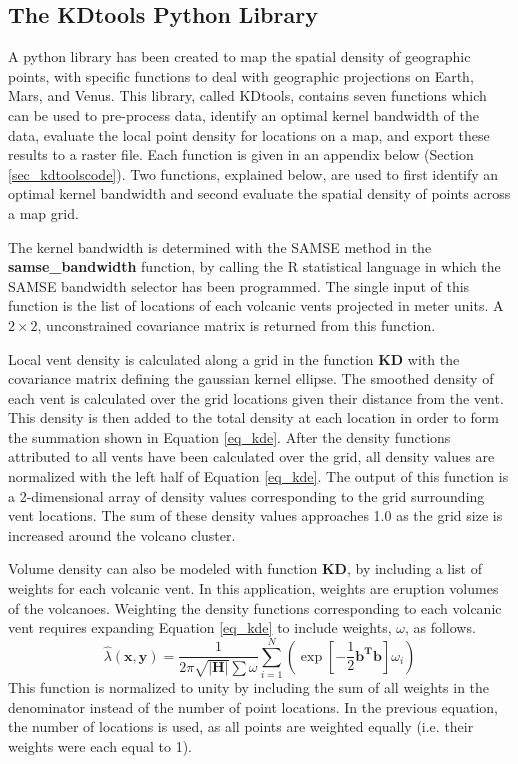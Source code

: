 \documentclass[12pt,letter]{article}
\begin{document}
\subsection{The KDtools Python Library}

A python library has been created to map the spatial density of geographic points, with specific functions to deal with geographic projections on Earth, Mars, and Venus. This library, called KDtools, contains seven functions which can be used to pre-process data, identify an optimal kernel bandwidth of the data, evaluate the local point density for locations on a map, and export these results to a raster file. Each function is given in an appendix below (Section \ref{sec_kdtoolscode}). Two functions, explained below, are used to first identify an optimal kernel bandwidth and second evaluate the spatial density of points across a map grid.

The kernel bandwidth is determined with the SAMSE method in the \textbf{samse\_bandwidth} function, by calling the R statistical language in which the SAMSE bandwidth selector has been programmed. The single input of this function is the list of locations of each volcanic vents projected in meter units. A $2\times 2$, unconstrained covariance matrix is returned from this function.

Local vent density is calculated along a grid in the function \textbf{KD} with the covariance matrix defining the gaussian kernel ellipse. The smoothed density of each vent is calculated over the grid locations given their distance from the vent. This density is then added to the total density at each location in order to form the summation shown in Equation \ref{eq_kde}. After the density functions attributed to all vents have been calculated over the grid, all density values are normalized with the left half of Equation \ref{eq_kde}. The output of this function is a 2-dimensional array of density values corresponding to the grid surrounding vent locations. The sum of these density values approaches 1.0 as the grid size is increased around the volcano cluster.

Volume density can also be modeled with function \textbf{KD}, by including a list of weights for each volcanic vent. In this application, weights are eruption volumes of the volcanoes. Weighting the density functions corresponding to each volcanic vent requires expanding Equation \ref{eq_kde} to include weights, $\omega$, as follows.
\begin{equation}
\hat{\lambda}(\mathbf{x,y})=\frac{1}{2\pi\sqrt{|\mathbf{H}|}\sum{\omega}}\sum\limits_{i=1}^{N}\left(\exp\left[-\frac{1}{2}\mathbf{b^Tb}\right]\omega_i\right)
\label{eq_weigthedkde}
\end{equation}
This function is normalized to unity by including the sum of all weights in the denominator instead of the number of point locations. In the previous equation, the number of locations is used, as all points are weighted equally (i.e. their weights were each equal to 1).
\end{document}
